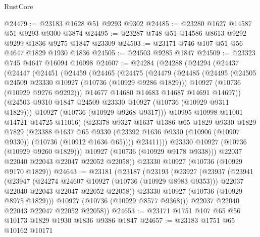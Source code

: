 \begin{lexlean}{RustCore}
\begin{coremodule}
@24479 := @23183 @1628 @51 @9293 @9302
@24485 := @23280 @1627 @14587 @51 @9293 @9300 @3874
@24495 := @23287 @748 @51 @14586 @8613 @9292 @9299 @1836 @9275 @1847 @23309
@24503 := @23171 @746 @107 @51 @56 @4647 @1829 @1930 @1836
@24505 := @24503 @9285 @1847
@24509 := @23323 @745 @4647 @16094 @16098
@24607 := @24284
    (@24288
      (@24294
        (@24437
          (@24447
            (@24451
              (@24459
                (@24465
                  (@24475
                    (@24479
                      (@24485
                        (@24495
                          (@24505 @24509 @23330 @10927 (@10736 (@10929 @9286 @1829)))
                          @10927
                          (@10736 (@10929 @9276 @9292)))
                        @14677
                        @14680
                        @14683
                        @14687
                        @14691
                        @14697))
                    (@24503 @9310 @1847 @24509 @23330 @10927 (@10736 (@10929 @9311 @1829)))
                    @10927
                    (@10736 (@10929 @9268 @9317)))
                  @10995
                  @10998
                  @11001
                  @14721
                  @14725
                  @11016)
                (@23378
                  @9327
                  @1637
                  @1386
                  @65
                  @1829
                  @9330
                  @1829
                  @7829
                  (@23388
                    @1637
                    @65
                    @9330
                    (@23392 @1636 @9330 (@10906 (@10907 @9330)) (@10736 (@10912 @1636 @65))))
                  @23411)))
            @23330
            @10927
            (@10736 (@10929 @9260 @1829)))
          @10927
          (@10736 (@10929 @9178 @9338)))
        @22037
        @22040
        @22043
        @22047
        @22052
        @22058))
    @23330
    @10927
    (@10736 (@10929 @9170 @1829))
@24643 := @23181
    (@23187
      (@23193
        (@23927
          (@23937
            (@23941
              (@23947
                (@24274 @24607 @10927 (@10736 (@10929 @8983 @9353)))
                @22037
                @22040
                @22043
                @22047
                @22052
                @22058))
            @23330
            @10927
            (@10736 (@10929 @8975 @1829)))
          @10927
          (@10736 (@10929 @8577 @9368)))
        @22037
        @22040
        @22043
        @22047
        @22052
        @22058))
@24653 := @23171 @1751 @107 @65 @56 @10173 @1829 @1930 @1836 @9386 @1847
@24657 := @23183 @1751 @65 @10162 @10171

\end{coremodule}
\end{lexlean}

